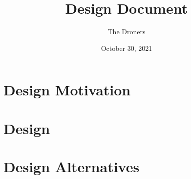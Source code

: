 \documentclass[11pt]{article}
\title{\vspace{-2cm}Design Document}
\author{The Droners}
\date{October 30, 2021}
\begin{document}
\maketitle
\section*{Design Motivation}


\section*{Design}


\section*{Design Alternatives}
\label{sec:alt}

\newpage



\end{document}
